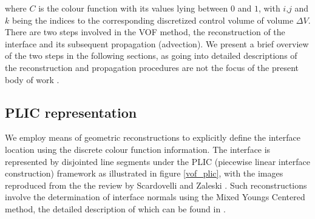 where $C$ is the colour function with its values lying between $0$ and $1$, 
with $i$,$j$ and $k$ being the indices to the corresponding discretized control volume of volume $\Delta V$.  
There are two steps involved in the VOF method, the reconstruction of the interface and its 
subsequent propagation (advection). We present a brief overview of the two steps in the following sections,
as going into detailed descriptions of the reconstruction and propagation procedures are 
not the focus of the present body of work .  


\subsection*{PLIC representation}
We employ means of geometric reconstructions to explicitly define the 
interface location using the discrete colour function information. 
The interface is represented by disjointed line segments under 
the PLIC (piecewise linear interface construction)
framework as illustrated in figure \ref{vof_plic}, with the images reproduced 
from the the review by Scardovelli and Zaleski . 
Such reconstructions involve the determination of interface normals 
using the Mixed Youngs Centered method, the detailed description 
of which can be found in \cite{zaleskibook}. 

